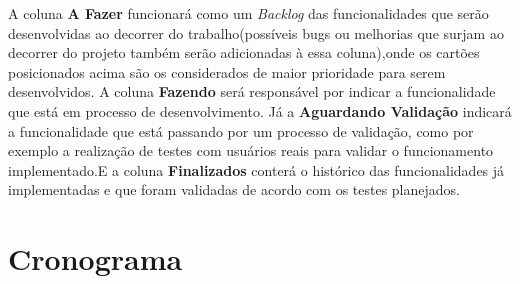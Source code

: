 A coluna \textbf{A Fazer} funcionará como um \textit{Backlog} das funcionalidades que serão desenvolvidas ao decorrer do trabalho(possíveis bugs ou melhorias que surjam ao decorrer do projeto também serão adicionadas à essa coluna),onde os cartões posicionados acima são os considerados de maior prioridade para serem desenvolvidos. A coluna \textbf{Fazendo} será responsável por indicar a funcionalidade que está em processo de desenvolvimento. Já a \textbf{Aguardando Validação} indicará a funcionalidade que está passando por um processo de validação, como por exemplo a realização de testes com usuários reais para validar o funcionamento implementado.E a coluna \textbf{Finalizados} conterá o histórico das funcionalidades já implementadas e que foram validadas de acordo com os testes planejados.

\section{Cronograma}

